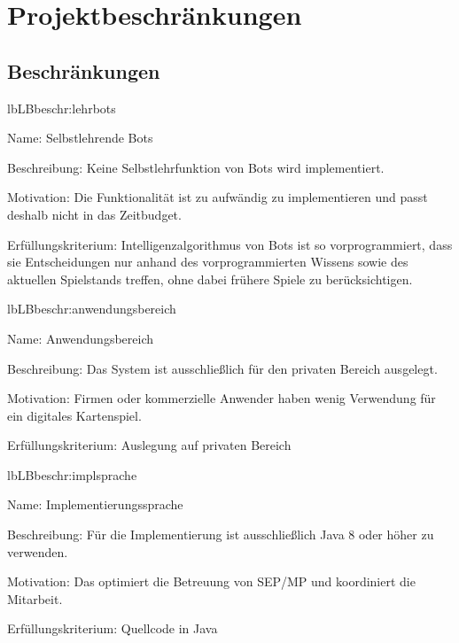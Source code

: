 \chapter{Projektbeschränkungen}

\section{Beschränkungen}

\setcounter{lb}{10}

\begin{description}[leftmargin=5em, style=sameline]
	
	\begin{lhp}{lb}{LB}{beschr:lehrbots}
		\item [Name:] Selbstlehrende Bots
		\item [Beschreibung:] Keine Selbstlehrfunktion von Bots wird implementiert.
		\item [Motivation:] Die Funktionalität ist zu aufwändig zu implementieren und passt deshalb nicht in das Zeitbudget.
		\item [Erfüllungskriterium:] Intelligenzalgorithmus von Bots ist so vorprogrammiert, dass sie Entscheidungen nur anhand des vorprogrammierten Wissens sowie des aktuellen Spielstands treffen, ohne dabei frühere Spiele zu berücksichtigen.
	\end{lhp}
	
	\begin{lhp}{lb}{LB}{beschr:anwendungsbereich}
		\item [Name:] Anwendungsbereich
		\item [Beschreibung:] Das System ist ausschließlich für den privaten Bereich ausgelegt.
		\item [Motivation:] Firmen oder kommerzielle Anwender haben wenig Verwendung für ein digitales Kartenspiel. 
		\item [Erfüllungskriterium:] Auslegung auf privaten Bereich
	\end{lhp}
	
		
	\begin{lhp}{lb}{LB}{beschr:implsprache}
		\item [Name:] Implementierungssprache
		\item [Beschreibung:] Für die Implementierung ist ausschließlich Java 8 oder höher zu verwenden.
		\item [Motivation:] Das optimiert die Betreuung von SEP/MP und koordiniert die Mitarbeit.
		\item [Erfüllungskriterium:] Quellcode in Java
	\end{lhp}
	

\end{description}
